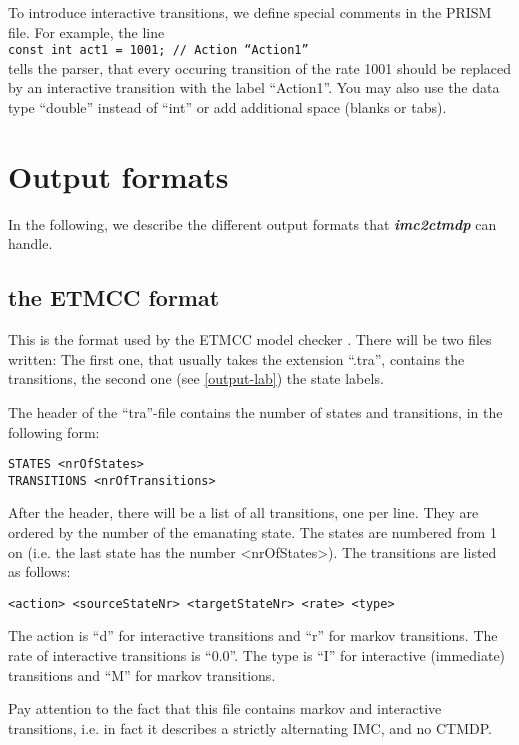 \documentclass[a4paper,11pt]{scrartcl}
\newcommand{\imcToCtmdp}{\textbf{\textit{imc2ctmdp}} }
\begin{document}
To introduce interactive transitions, we define special comments in the PRISM
file. For example, the line\\
\texttt{const int act1 = 1001; // Action ``Action1''}\\
tells the parser, that every occuring transition of the rate 1001 should be
replaced by an interactive transition with the label ``Action1''.
You may also use the data type ``double'' instead of ``int'' or add additional space (blanks or tabs).


\section{Output formats}

In the following, we describe the different output formats that \imcToCtmdp can handle.

\subsection{the ETMCC format}\label{output-etmcc}

This is the format used by the ETMCC model checker \cite{etmcc-page}.
There will be two files written: The first one, that usually takes the
extension ``.tra'', contains the transitions, the second one (see \ref{output-lab}) the state labels.

The header of the ``tra''-file contains the number of states and transitions,
in the following form:
\begin{verbatim}
STATES <nrOfStates>
TRANSITIONS <nrOfTransitions>
\end{verbatim}

After the header, there will be a list of all transitions, one per line.
They are ordered by the number of the emanating state. The states are numbered
from 1 on (i.e. the last state has the number <nrOfStates>).
The transitions are listed as follows:
\begin{verbatim}
<action> <sourceStateNr> <targetStateNr> <rate> <type>
\end{verbatim}
The action is ``d'' for interactive transitions and ``r'' for markov transitions.
The rate of interactive transitions is ``0.0''.
The type is ``I'' for interactive (immediate) transitions and ``M'' for markov transitions.

Pay attention to the fact that this file contains markov and interactive
transitions, i.e. in fact it describes a strictly alternating IMC, and no
CTMDP.
\end{document}
